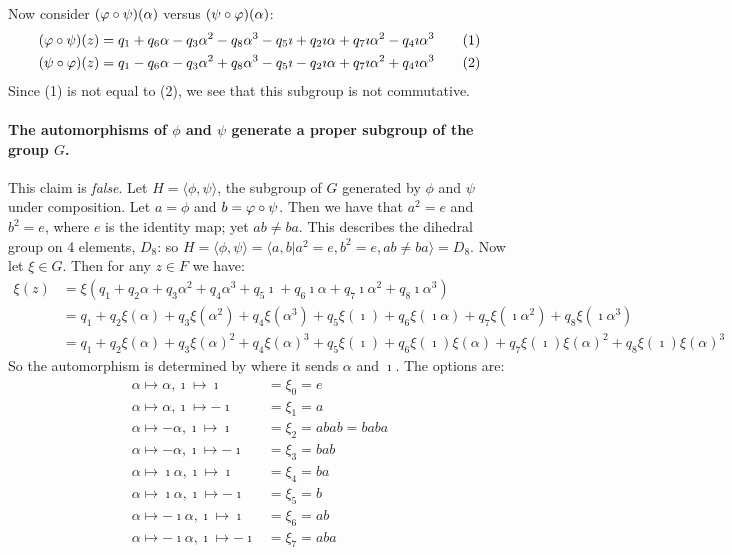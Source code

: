 Now consider $(\varphi \circ \psi)(\alpha)$ versus $(\psi \circ \varphi)(\alpha)$:
\begin{align*}
	(\varphi \circ \psi)(z) &= q_1 + q_6 \alpha - q_3 \alpha^2 - q_8 \alpha^3 - q_5 \imath + q_2 \imath\alpha + q_7 \imath\alpha^2 - q_4 \imath\alpha^3\tag{1}\\
	(\psi \circ \varphi)(z) &= q_1 - q_6 \alpha - q_3 \alpha^2 + q_8 \alpha^3 - q_5 \imath - q_2 \imath\alpha + q_7 \imath\alpha^2 + q_4 \imath\alpha^3\tag{2}
\end{align*}
Since (1) is not equal to (2), we see that this subgroup is not commutative.

\paragraph*{The automorphisms of $\phi$ and $\psi$ generate a proper subgroup of the group $G$.}
This claim is \emph{false}. Let $H = \langle \phi, \psi \rangle$, the subgroup of $G$ generated by $\phi$ and $\psi$ under composition. Let $a = \phi$ and $b = \varphi \circ \psi$. Then we have that $a^2 = e$ and $b^2 = e$, where $e$ is the identity map; yet $a b \neq b a$. This describes the dihedral group on 4 elements, $D_8$: so $H = \langle \phi, \psi \rangle = \langle a, b | a^2 = e, b^2 = e, ab \neq ba \rangle = D_8$. Now let $\xi \in G$. Then for any $z \in F$ we have:
\begin{align*}
	\xi(z)	&= \xi(q_1 + q_2 \alpha + q_3 \alpha^2 + q_4 \alpha^3 + q_5 \imath + q_6 \imath\alpha + q_7 \imath\alpha^2 + q_8 \imath\alpha^3)\\
					&= q_1 + q_2 \xi(\alpha) + q_3 \xi(\alpha^2) + q_4 \xi(\alpha^3) + q_5 \xi(\imath) + q_6 \xi(\imath\alpha) + q_7 \xi(\imath\alpha^2) + q_8 \xi(\imath\alpha^3)\\
					&= q_1 + q_2 \xi(\alpha) + q_3 \xi(\alpha)^2 + q_4 \xi(\alpha)^3 + q_5 \xi(\imath) + q_6 \xi(\imath)\xi(\alpha) + q_7 \xi(\imath)\xi(\alpha)^2 + q_8 \xi(\imath)\xi(\alpha)^3
\end{align*}
So the automorphism is determined by where it sends $\alpha$ and $\imath$. The options are:
\begin{align*}
\alpha \mapsto \alpha, \imath \mapsto \imath 						&= \xi_0 = e\\
\alpha \mapsto \alpha, \imath \mapsto -\imath						&= \xi_1 = a\\
%
\alpha \mapsto -\alpha, \imath \mapsto \imath 					&= \xi_2 = abab = baba\\
\alpha \mapsto -\alpha, \imath \mapsto -\imath					&= \xi_3 = bab\\
\alpha \mapsto \imath\alpha, \imath \mapsto \imath			&= \xi_4 = ba\\
\alpha \mapsto \imath\alpha, \imath \mapsto -\imath			&= \xi_5 = b\\
%
\alpha \mapsto -\imath\alpha, \imath \mapsto \imath			&= \xi_6 = ab\\
\alpha \mapsto -\imath\alpha, \imath \mapsto -\imath		&= \xi_7 = aba
\end{align*}
